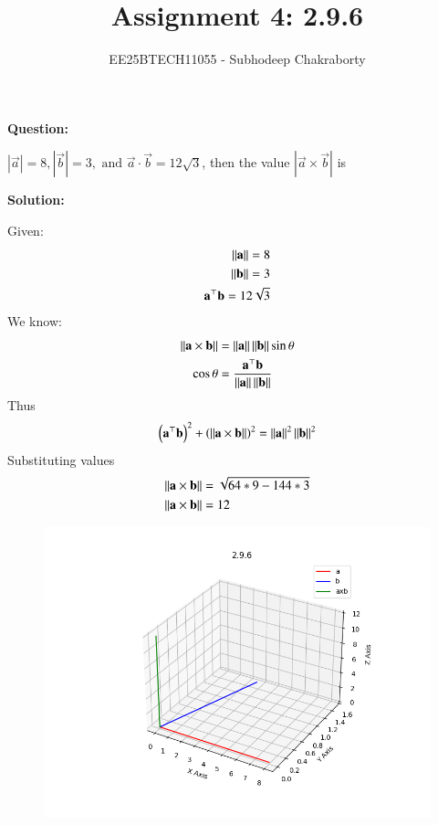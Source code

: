 \documentclass[journal,12pt,onecolumn]{IEEEtran}
\theoremstyle{remark}
\begin{document}

\vspace{3cm}

\title{Assignment 4: 2.9.6}
\author{EE25BTECH11055 - Subhodeep Chakraborty}
\maketitle
\hrulefill
\bigskip

\renewcommand{\thefigure}{\theenumi}
\renewcommand{\thetable}{\theenumi}

\textbf{Question:}\par
$|\vec{a}| = 8, |\vec{b}| = 3, \text{ and } \vec{a}\cdot\vec{b} = 12\sqrt{3}$, then the value $|\vec{a}\times\vec{b}|$ is \par
\textbf{Solution:}\par

Given:
\begin{align}
 \left\lVert\mathbf{a}\right\rVert = 8 \\
 \left\lVert\mathbf{b}\right\rVert = 3 \\
 \mathbf{a}^\top\mathbf{b} = 12\sqrt{3}
\end{align}
We know:
\begin{align}
 \left\lVert\mathbf{a}\times\mathbf{b}\right\rVert &= \left\lVert\mathbf{a}\right\rVert\left\lVert\mathbf{b}\right\rVert\sin\theta \\
 \cos\theta &= \frac{\mathbf{a}^\top\mathbf{b}}{\left\lVert\mathbf{a}\right\rVert\left\lVert\mathbf{b}\right\rVert}
\end{align}
Thus
\begin{align}
 \left(\mathbf{a}^\top\mathbf{b}\right)^2 + \left(\left\lVert\mathbf{a}\times\mathbf{b}\right\rVert\right)^2 = \left\lVert\mathbf{a}\right\rVert^2\left\lVert\mathbf{b}\right\rVert^2
\end{align}
Substituting values
\begin{align}
\left\lVert\mathbf{a}\times\mathbf{b}\right\rVert &= \sqrt{64*9-144*3} \\
\left\lVert\mathbf{a}\times\mathbf{b}\right\rVert &= 12
\end{align}
\begin{figure}[H]
    \centering
    \includegraphics{figs/plot.png}
    \caption*{}
    \label{fig:plot}
\end{figure}
\end{document}
